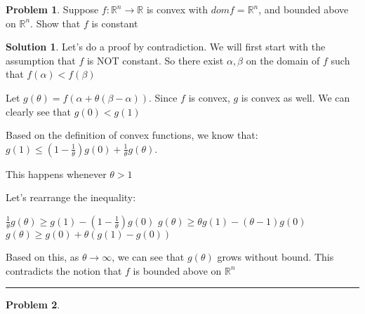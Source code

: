 \documentclass{article}
\theoremstyle{definition}
\newtheorem{problem}{Problem}
\def\fline{\rule{0.75\linewidth}{0.5pt}}
\newcommand{\finishline}{\begin{center}\fline\end{center}}
\newtheorem*{solution*}{Solution}
\newenvironment{solution}{\begin{solution*}}{{\finishline} \end{solution*}}
\begin{document}
\begin{problem}
    Suppose $f: \mathbb{R}^n \rightarrow \mathbb{R}$ is convex with $dom f = \mathbb{R}^n$, and bounded above on $\mathbb{R}^n$. Show that $f$ is constant

    \begin{solution}
        Let's do a proof by contradiction. We will first start with the assumption that $f$ is NOT constant. So there exist $\alpha, \beta$ on the domain of $f$ such that $f(\alpha) < f(\beta)$ \newline 

        Let $g(\theta) = f(\alpha + \theta(\beta - \alpha))$. Since $f$ is convex, $g$ is convex as well. We can clearly see that $g(0) < g(1)$ \newline 

        Based on the definition of convex functions, we know that: \newline 
        $g(1) \leq (1 - \frac{1}{\theta}) g(0) + \frac{1}{\theta} g(\theta)$. 

        This happens whenever $\theta > 1$ \newline 

        Let's rearrange the inequality: \newline 

        $\frac{1}{\theta} g(\theta) \geq g(1) - (1 - \frac{1}{\theta}) g(0)$ \newline 
        $g(\theta) \geq \theta g(1) - (\theta - 1) g(0)$ \newline 
        $g(\theta) \geq g(0) + \theta (g(1) - g(0))$ \newline 


        Based on this, as $\theta \rightarrow \infty$, we can see that $g(\theta)$ grows without bound. This contradicts the notion that $f$ is bounded above on $\mathbb{R}^n$
        
        
    \end{solution}  
\end{problem}

\begin{problem}
    
\end{problem}
\end{document}
